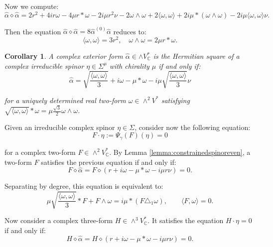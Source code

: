 \documentclass[10pt,a4paper,twoside,reqno]{amsart}
\theoremstyle{plain}
\newtheorem{cor}[thm]{Corollary}
\theoremstyle{definition}
\theoremstyle{remark}
\def\C{\mathbb{C}}
\newcommand{\escal}[1]{\langle#1\rangle}
\begin{document}
\noindent
Now we compute: $$\widehat{\alpha}\diamond\widehat{\alpha}=2r^2+4ir\omega-4\mu r*\omega-2i\mu r^2\nu-2\omega\wedge\omega+2\escal{\omega,\omega}+2i\mu*(\omega\wedge\omega)-2i\mu\escal{\omega,\omega}\nu.$$

Then the equation $\widehat{\alpha}\diamond\widehat{\alpha}=8\widehat{\alpha}^{(0)}\widehat{\alpha}$ reduces to: $$\escal{\omega,\omega}=3r^2,\quad\omega\wedge\omega=2\mu r*\omega.$$

\begin{cor}
\label{cor:Hermitian6d}
A complex exterior form $\widehat{\alpha} \in\wedge V^*_\C$ is the Hermitian square of a complex irreducible spinor $\eta\in\Sigma^{\mu}$ with chirality $\mu$ if and only if:
\begin{equation*}
\widehat{\alpha} = \sqrt{\frac{\escal{\omega,\omega}}{3}} + i\omega-\mu*\omega-i\mu\sqrt{\frac{\escal{\omega,\omega}}{3}}\nu
\end{equation*}

\noindent
for a uniquely determined real two-form $\omega\in\wedge^2V^*$ satisfying $\sqrt{\escal{\omega,\omega}}*\omega=\mu\frac{\sqrt{3}}{2}\omega\wedge\omega$.
\end{cor}

Given an irreducible complex spinor $\eta\in \Sigma$, consider now the following equation:
\begin{equation*}
F\cdot \eta := \Psi_{\gamma}(F)(\eta) = 0
\end{equation*}

\noindent
for a complex two-form $F\in \wedge^2 V_\C^{\ast}$. By Lemma \ref{lemma:constrainedspinoreven}, a two-form $F$ satisfies the previous equation if and only if: 
\begin{equation*}
F\diamond\widehat{\alpha}=F\diamond(r+i\omega-\mu*\omega-i\mu r\nu)=0.
\end{equation*}

\noindent
Separating by degree, this equation is equivalent to: 
\begin{equation*}
\mu \sqrt{\frac{\escal{\omega,\omega}}{3}} \ast F + F\wedge\omega = i\mu*(F\triangle_1\omega) ,\qquad \escal{F,\omega}=0.    
\end{equation*}
 
\noindent
Now consider a complex three-form $H\in\wedge^3V_\C^*$. It satisfies the equation $H\cdot\eta=0$ if and only if: 
\begin{equation*}
H\diamond\widehat{\alpha}=H\diamond(r+i\omega-\mu*\omega-i\mu r\nu)=0.
\end{equation*}
\end{document}
